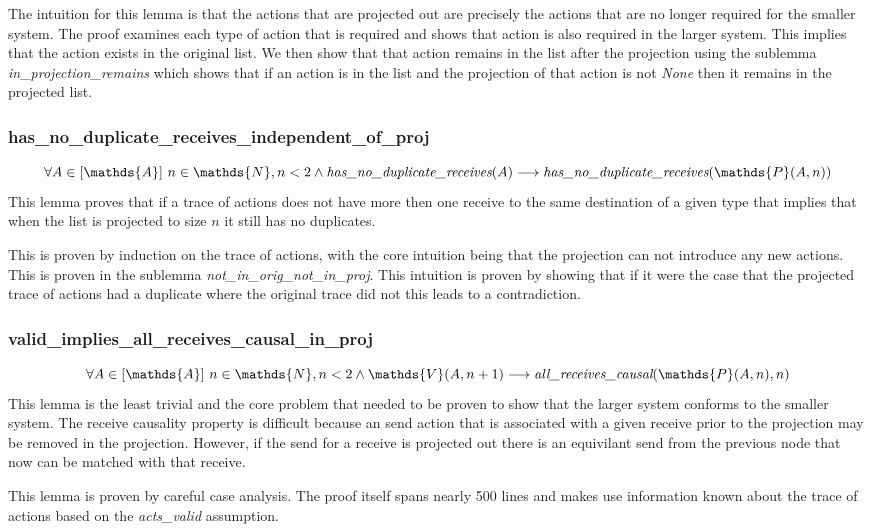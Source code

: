 \documentclass[runningheads]{llncs}
\newcommand{\action}{\mathds{A}}
\newcommand{\listaction}{[\action]}
\newcommand{\actsvalid}[2]{\mathds{V}(#1, #2)}
\newcommand{\projectsize}[2]{\mathds{P}(#1, #2)}
\newcommand{\hndr}[1]{\emph{has\_no\_duplicate\_receives}(#1)}
\newcommand{\allrc}[2]{\emph{all\_receives\_causal}(#1, #2)}
\begin{document}
The intuition for this lemma is that the actions that are projected out are precisely the actions that are no longer required for the smaller system. The proof examines each type of action that is required and shows that action is also required in the larger system. This implies that the action exists in the original list. We then show that that action remains in the list after the projection using the sublemma \emph{in\_projection\_remains} which shows that if an action is in the list and the projection of that action is not \emph{None} then it remains in the projected list.

\subsubsection{has\_no\_duplicate\_receives\_independent\_of\_proj}
$$ \forall A \in \listaction\ n \in \mathds{N}, n < 2 \wedge \hndr{A} \longrightarrow \hndr{\projectsize{A}{n}} $$
This lemma proves that if a trace of actions does not have more then one receive to the same destination of a given type that implies that when the list is projected to size $n$ it still has no duplicates.

This is proven by induction on the trace of actions, with the core intuition being that the projection can not introduce any new actions. This is proven in the sublemma \emph{not\_in\_orig\_not\_in\_proj}. This intuition is proven by showing that if it were the case that the projected trace of actions had a duplicate where the original trace did not this leads to a contradiction. 


\subsubsection{valid\_implies\_all\_receives\_causal\_in\_proj}
$$ \forall A \in \listaction\ n \in \mathds{N}, n < 2 \wedge \actsvalid{A}{n+1} \longrightarrow \allrc{\projectsize{A}{n}}{n} $$
This lemma is the least trivial and the core problem that needed to be proven to show that the larger system conforms to the smaller system. The receive causality property is difficult because an send action that is associated with a given receive prior to the projection may be removed in the projection. However, if the send for a receive is projected out there is an equivilant send from the previous node that now can be matched with that receive. 

This lemma is proven by careful case analysis. The proof itself spans nearly 500 lines and makes use information known about the trace of actions based on the \emph{acts\_valid} assumption. 
\end{document}
